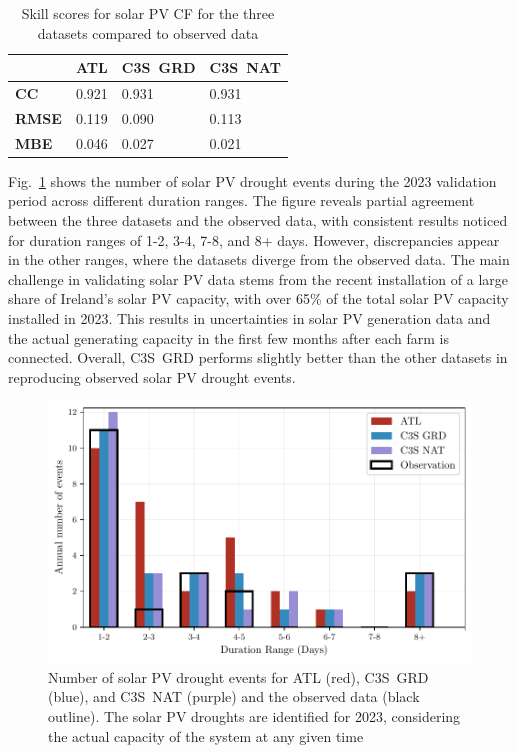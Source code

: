 \documentclass[preprint, 12pt]{elsarticle}
\begin{document}
\begin{table}[!ht]
	\centering
	\begin{tabular}{l|lll|}
		\cline{2-4}
		& \textbf{ATL} & \textbf{C3S~GRD} & \textbf{C3S~NAT} \\ \hline
		\multicolumn{1}{|l|}{\textbf{CC}}   & 0.921           & 0.931            & 0.931            \\ \hline
		\multicolumn{1}{|l|}{\textbf{RMSE}} & 0.119           & 0.090            & 0.113            \\ \hline
		\multicolumn{1}{|l|}{\textbf{MBE}}   & 0.046           & 0.027           & 0.021           \\ \hline
	\end{tabular}
	\caption{Skill scores for solar PV CF for the three datasets compared to observed data}
	\label{tab:pv_skill_scores}
\end{table}

Fig.~\ref{fig:bar_number_events_verification_pv} shows the number of solar PV drought events during the 2023 validation period across different duration ranges. The figure reveals partial agreement between the three datasets and the observed data, with consistent results noticed for duration ranges of 1-2, 3-4, 7-8, and 8+ days. However, discrepancies appear in the other ranges, where the datasets diverge from the observed data. The main challenge in validating solar PV data stems from the recent installation of a large share of Ireland’s solar PV capacity, with over 65\% of the total solar PV capacity installed in 2023. This results in uncertainties in solar PV generation data and the actual generating capacity in the first few months after each farm is connected. Overall, C3S~GRD performs slightly better than the other datasets in reproducing observed solar PV drought events.

\begin{figure}[!ht]
	\centering
	\includegraphics[width=\textwidth]{verification_pv_number_events.pdf}
	\caption{Number of solar PV drought events for ATL (red), C3S~GRD (blue), and C3S~NAT (purple) and the observed data (black outline). The solar PV droughts are identified for 2023, considering the actual capacity of the system at any given time}
	\label{fig:bar_number_events_verification_pv}
\end{figure}
\end{document}

